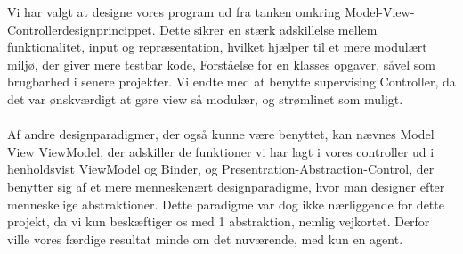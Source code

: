 Vi har valgt at designe vores program ud fra tanken omkring Model-View-Controllerdesignprincippet. Dette sikrer en stærk adskillelse mellem funktionalitet, input og repræsentation, hvilket hjælper til et mere modulært miljø, der giver mere testbar kode, Forståelse for en klasses opgaver, såvel som brugbarhed i senere projekter. Vi endte med at benytte supervising Controller, da det var ønskværdigt at gøre view så modulær, og strømlinet som muligt.\\
\\
Af andre designparadigmer, der også kunne være benyttet, kan nævnes Model View ViewModel, der adskiller de funktioner vi har lagt i vores controller ud i henholdsvist ViewModel og Binder, og Presentration-Abstraction-Control, der benytter sig af et mere menneskenært designparadigme, hvor man designer efter menneskelige abstraktioner. Dette paradigme var dog ikke nærliggende for dette projekt, da vi kun beskæftiger os med 1 abstraktion, nemlig vejkortet. Derfor ville vores færdige resultat minde om det nuværende, med kun en agent.